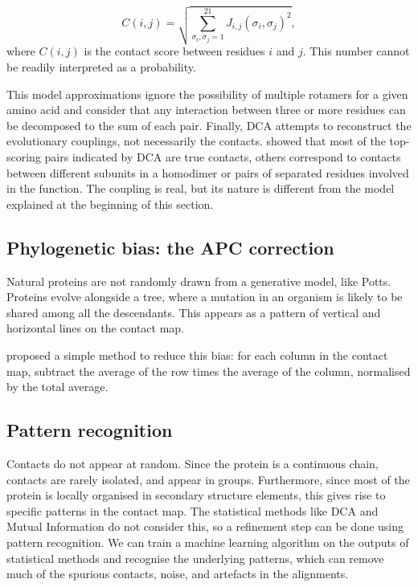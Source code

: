 \begin{equation*}
C(i, j) = \sqrt{\sum_{\sigma_i, \sigma_j=1}^{21} J_{i, j}(\sigma_i, \sigma_j)^2},
\end{equation*}
where $C(i, j)$ is the contact score between residues $i$ and $j$.
This number cannot be readily interpreted as a probability.

This model approximations ignore the possibility of multiple rotamers for a given amino acid 
and consider that any interaction between three or more residues can be decomposed to the sum of each pair.
Finally, DCA attempts to reconstruct the evolutionary couplings, not necessarily the contacts.
\citet{contact_errors} showed that most of the top-scoring pairs indicated by DCA are true contacts, others correspond to contacts between different subunits in a homodimer or pairs of separated residues involved in the function.
The coupling is real, but its nature is different from the model explained at the beginning of this section.

\subsection[Phylogenetic bias]{Phylogenetic bias: the APC correction}
Natural proteins are not randomly drawn from a generative model, like Potts.
Proteins evolve alongside a tree, where a mutation in an organism is likely to be shared among all the descendants.
This appears as a pattern of vertical and horizontal lines on the contact map.

\citet{apc} proposed a simple method to reduce this bias: for each column in the contact map, subtract the average of the row times the average of the column, normalised by the total average.


\subsection{Pattern recognition}
Contacts do not appear at random.
Since the protein is a continuous chain, contacts are rarely isolated, and appear in groups.
Furthermore, since most of the protein is locally organised in secondary structure elements, this gives rise to specific patterns in the contact map.
The statistical methods like DCA and Mutual Information do not consider this, so a refinement step can be done using pattern recognition.
We can train a machine learning algorithm on the outputs of statistical methods and recognise the underlying patterns, which can remove much of the spurious contacts, noise, and artefacts in the alignments.

